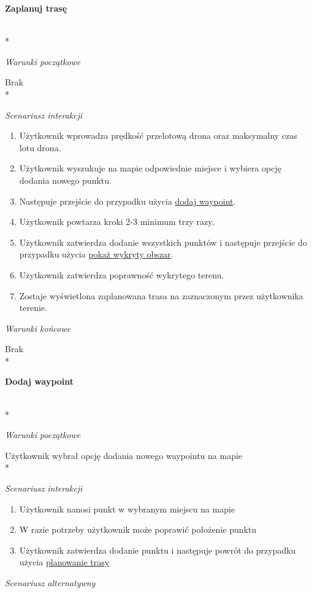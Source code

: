 \hypertarget{plan route}{\textbf{Zaplanuj trasę}} \\*

\textit{Warunki początkowe}

Brak \\*

\textit{Scenariusz interakcji}
\begin{enumerate}
    \item Użytkownik wprowadza prędkość przelotową drona oraz maksymalny czas lotu drona.
    \item Użytkownik wyszukuje na mapie odpowiednie miejsce i wybiera opcję dodania nowego punktu.
    \item Następuje przejście do przypadku użycia \hyperlink{add waypoint}{dodaj waypoint}.
    \item Użytkownik powtarza kroki 2-3 minimum trzy razy.
    \item Użytkownik zatwierdza dodanie wszystkich punktów i następuje przejście do przypadku użycia \hyperlink{show detected area}{pokaż wykryty obszar}.
    \item Użytkownik zatwierdza poprawność wykrytego terenu.
    \item Zostaje wyświetlona zaplanowana trasa na zaznaczonym przez użytkownika terenie.
\end{enumerate}

\vspace{\baselineskip}
\textit{Warunki końcowe}

Brak \\*

\hypertarget{add waypoint}{\textbf{Dodaj waypoint}} \\*

\textit{Warunki początkowe}

Użytkownik wybrał opcję dodania nowego waypointu na mapie \\*

\textit{Scenariusz interakcji}
\begin{enumerate}
    \item Użytkownik nanosi punkt w wybranym miejscu na mapie
    \item W razie potrzeby użytkownik może poprawić położenie punktu
    \item Użytkownik zatwierdza dodanie punktu i następuje powrót do przypadku użycia \hyperlink{plan route}{planowanie trasy}
\end{enumerate}

\vspace{\baselineskip}
\textit{Scenariusz alternatywny}

